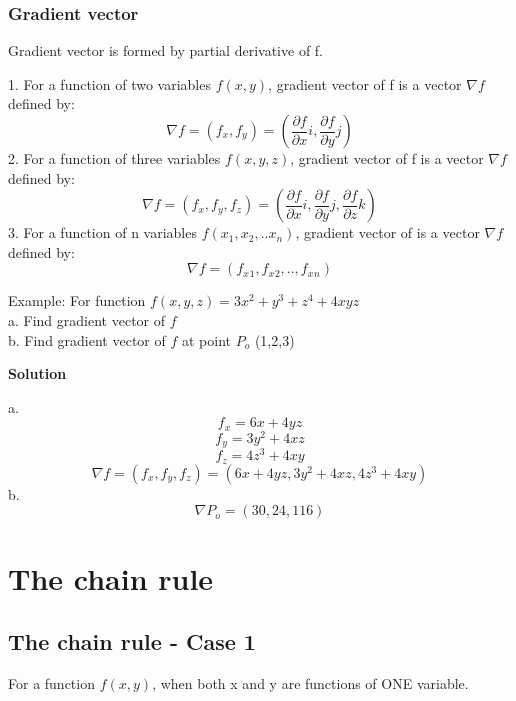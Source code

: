 \documentclass[12pt]{article}
\begin{document}
 \subsubsection{ Gradient vector}
 Gradient vector is formed by partial derivative of f.
 \begin{mybox}
     1. For a function of two variables $f(x,y)$, gradient vector of f is a vector $\nabla f $ defined by:
     $$\nabla f = (f_x,f_y) = (\frac{\partial f}{\partial x} i,\frac{\partial f}{\partial y}j)$$
     2. For a function of three variables $f(x,y,z)$, gradient vector of f is a vector $\nabla f $ defined by:
     $$\nabla f = (f_x,f_y,f_z) = (\frac{\partial f}{\partial x} i,\frac{\partial f}{\partial y}j, \frac{\partial f}{\partial z}k)$$
     3. For a function of n variables $f(x_1,x_2,..x_n)$, gradient vector of is a vector $\nabla f $ defined by:
     $$\nabla f = (f_x{}_1,f_x{}_2,..,f_x{}_n) $$
 \end{mybox}
 Example: For function $f(x,y,z) = 3x^2 + y^3 +z^4 +4xyz$ \\
 a. Find gradient vector of $f$ \\
 b.  Find gradient vector of $f$ at point $P_o$ (1,2,3)
 \begin{center}
     \textbf{Solution}
 \end{center}
 a.
 $$f_x = 6x + 4yz$$
 $$f_y = 3y^2 + 4xz$$
 $$f_z = 4z^3 +4xy$$
 $$\nabla f = (f_x, f_y,f_z) = (6x + 4yz,3y^2 + 4xz,4z^3 +4xy)$$
 b. \\
 $$\nabla P_o = (30,24, 116)  $$
 
 \section{The chain rule}
 \subsection{The chain rule - Case 1}
 For a function $f(x, y)$, when both x and y are functions of ONE
variable.
\end{document}
